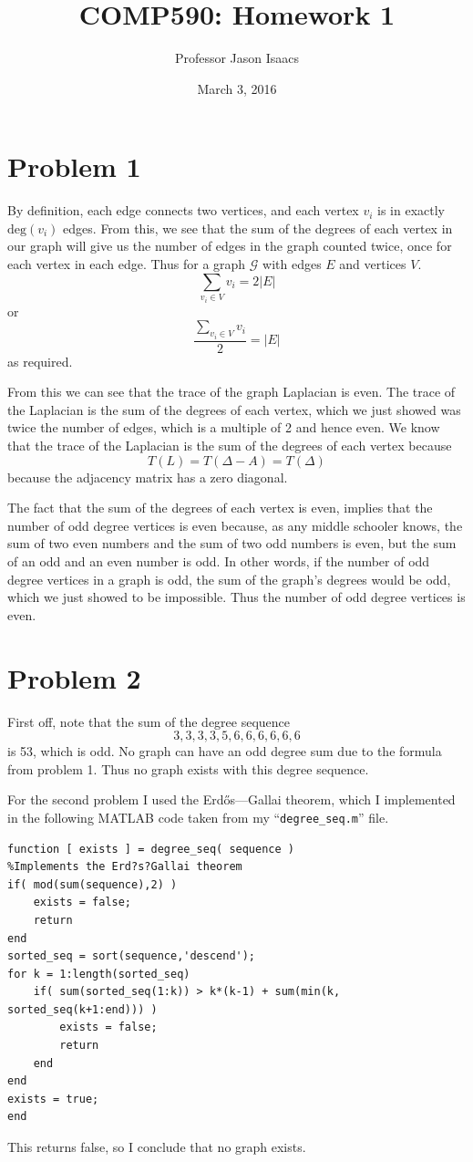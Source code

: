 \documentclass{article}
\title{COMP590: Homework 1}
\author{Professor Jason Isaacs}
\date{March 3, 2016}
\begin{document}
\maketitle
\section*{Problem 1}
By definition, each edge connects two vertices, and each vertex $v_i$ is in
exactly $\text{deg}(v_i)$ edges. From this, we see that the sum of the
degrees of each vertex in our graph will give us the number of edges in the
graph counted twice, once for each vertex in each edge. Thus for a graph
$\mathcal{G}$ with edges $E$ and vertices $V$. 
\[ \sum_{v_i \in V} v_i = 2|E| \]
or 
\[ \frac{\sum_{v_i \in V} v_i}{2} = |E| \]
as required.

From this we can see that the trace of the graph Laplacian is even. The trace of
the Laplacian is the sum of the degrees of each vertex, which we just showed was
twice the number of edges, which is a multiple of 2 and hence even. We know that
the trace of the Laplacian is the sum of the degrees of each vertex because 
\[ T(L) = T(\Delta - A) = T(\Delta) \]
because the adjacency matrix has a zero diagonal. 

The fact that the sum of the degrees of each vertex is even, implies that the
number of odd degree vertices is even because, as any middle schooler knows, the
sum of two even numbers and the sum of two odd numbers is even, but the sum of
an odd and an even number is odd. In other words, if the number of odd degree
vertices in a graph is odd, the sum of the graph's degrees would be odd, which
we just showed to be impossible. Thus the number of odd degree vertices is even.

\section*{Problem 2}
First off, note that the sum of the degree sequence
\[ 3, 3, 3, 3, 5, 6, 6, 6, 6, 6, 6 \]
is 53, which is odd. No graph can have an odd degree sum due to the formula from
problem 1. Thus no graph exists with this degree sequence.

For the second problem I used the Erd\H{o}s--–Gallai theorem, which I implemented in the
following MATLAB code taken from my ``\texttt{degree\_seq.m}'' file.
\begin{verbatim}
function [ exists ] = degree_seq( sequence )
%Implements the Erd?s?Gallai theorem
if( mod(sum(sequence),2) )
    exists = false;
    return
end
sorted_seq = sort(sequence,'descend');
for k = 1:length(sorted_seq)
    if( sum(sorted_seq(1:k)) > k*(k-1) + sum(min(k, sorted_seq(k+1:end))) )
        exists = false;
        return
    end
end
exists = true;
end
\end{verbatim}
This returns false, so I conclude that no graph exists. 
\end{document}
